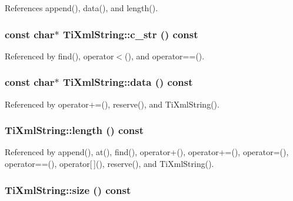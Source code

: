 References append(), data(), and length().
\subsubsection[c\_\-str]{\setlength{\rightskip}{0pt plus 5cm}const char$\ast$ TiXmlString::c\_\-str () const\hspace{0.3cm}{\tt  [inline]}}\label{classTiXmlString_5581ca641d915551d3cda90f8e7bf49b}




Referenced by find(), operator$<$(), and operator==().
\subsubsection[data]{\setlength{\rightskip}{0pt plus 5cm}const char$\ast$ TiXmlString::data () const\hspace{0.3cm}{\tt  [inline]}}\label{classTiXmlString_00abc60f135c7ca1951c7334cc2c7993}




Referenced by operator+=(), reserve(), and TiXmlString().
\subsubsection[length]{ TiXmlString::length () const\hspace{0.3cm}{\tt  [inline]}}\label{classTiXmlString_3202f27d139a3fac79205f1f3c707727}




Referenced by append(), at(), find(), operator+(), operator+=(), operator=(), operator==(), operator[$\,$](), reserve(), and TiXmlString().
\subsubsection[size]{ TiXmlString::size () const\hspace{0.3cm}{\tt  [inline]}}\label{classTiXmlString_96103e5c0f67e987fa48527e1f47a1f6}


